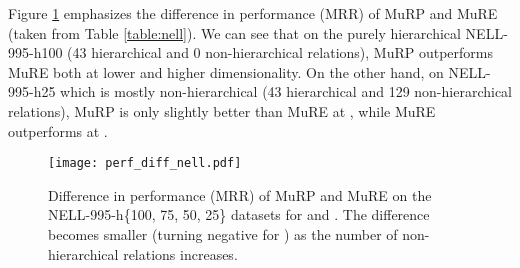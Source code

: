 \documentclass{article}
\begin{document}
\begin{table}[!htbp]
	\centering
	\caption{Link prediction results on the NELL-995-h\{100, 75, 50, 25\} datasets for  and .}
	\vspace{0.2cm}
     \label{table:nell}
 \end{table}


Figure \ref{fig:perf_diff_nell} emphasizes the difference in performance (MRR) of MuRP and MuRE (taken from Table \ref{table:nell}). We can see that on the purely hierarchical NELL-995-h100 (43 hierarchical and 0 non-hierarchical relations), MuRP outperforms MuRE both at lower and higher dimensionality. On the other hand, on NELL-995-h25 which is mostly non-hierarchical (43 hierarchical and 129 non-hierarchical relations), MuRP is only slightly better than MuRE at , while MuRE outperforms at .

\begin{figure}[!htb]
\centering
\texttt{[image: perf\_diff\_nell.pdf]}
\caption{Difference in performance (MRR) of MuRP and MuRE on the NELL-995-h\{100, 75, 50, 25\} datasets for  and . The difference becomes smaller (turning negative for ) as the number of non-hierarchical relations increases.}
\label{fig:perf_diff_nell}
\end{figure}
\end{document}
